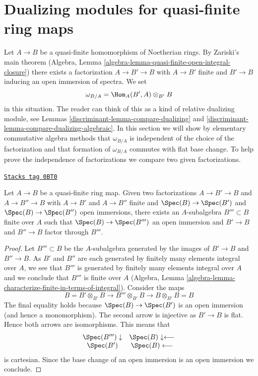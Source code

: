 \section{Dualizing modules for quasi-finite ring maps}
\label{discriminant-section-quasi-finite-dualizing}
Let $A \to B$ be a quasi-finite homomorphism of Noetherian rings. By
Zariski's main theorem
(Algebra, Lemma \ref{algebra-lemma-quasi-finite-open-integral-closure})
there exists a factorization $A \to B' \to B$ with
$A \to B'$ finite and $B' \to B$ inducing an open immersion of spectra.
We set
\begin{equation}
\label{equation-dualizing}
\omega_{B/A} = \Hom_A(B', A) \otimes_{B'} B
\end{equation}
in this situation. The reader can think of this as a kind of relative
dualizing module, see Lemmas \ref{discriminant-lemma-compare-dualizing} and
\ref{discriminant-lemma-compare-dualizing-algebraic}.
In this section we will show by elementary commutative algebra methods
that $\omega_{B/A}$ is independent of the choice of the factorization
and that formation of $\omega_{B/A}$ commutes with flat base change.
To help prove the independence of factorizations we compare two
given factorizations.

\begin{lemma}
\label{discriminant-lemma-dominate-factorizations}
\href{https://stacks.math.columbia.edu/tag/0BT0}{\texttt{Stacks tag 0BT0}}

Let $A \to B$ be a quasi-finite ring map. Given two factorizations
$A \to B' \to B$ and $A \to B'' \to B$ with
$A \to B'$ and $A \to B''$ finite and $\Spec(B) \to \Spec(B')$
and $\Spec(B) \to \Spec(B'')$ open immersions, there exists
an $A$-subalgebra $B''' \subset B$ finite over $A$ such that
$\Spec(B) \to \Spec(B''')$ an open immersion and $B' \to B$ and
$B'' \to B$ factor through $B'''$.
\end{lemma}

\begin{proof}
Let $B''' \subset B$ be the $A$-subalgebra generated by the images
of $B' \to B$ and $B'' \to B$. As $B'$ and $B''$ are each generated
by finitely many elements integral over $A$, we see that $B'''$ is
generated by finitely many elements integral over $A$ and we conclude
that $B'''$ is finite over $A$
(Algebra, Lemma \ref{algebra-lemma-characterize-finite-in-terms-of-integral}).
Consider the maps
$$
B = B' \otimes_{B'} B \to B''' \otimes_{B'} B \to B \otimes_{B'} B = B
$$
The final equality holds because $\Spec(B) \to \Spec(B')$ is an
open immersion (and hence a monomorphism). The second arrow is injective
as $B' \to B$ is flat. Hence both arrows are isomorphisms.
This means that
$$
\begin{array}{cc}\Spec(B''') \downarrow & \Spec(B) \downarrow\longleftarrow \\ \Spec(B') & \Spec(B) \longleftarrow\end{array}
$$
is cartesian. Since the base change of an open immersion is an
open immersion we conclude.
\end{proof}

